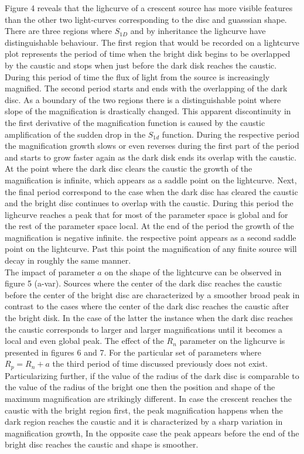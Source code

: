 Figure 4 reveals that the lighcurve of a crescent source has more visible features than the other two light-curves
corresponding to the disc and guasssian shape. There are three regions where $S_{1D}$ and by inheritance the lighcurve
 have distinguishable behaviour. The first region that would be recorded on a lightcurve plot represents the period
of time when the bright disk begins to be overlapped by the caustic and stops when just before the dark disk reaches
the caustic. During this period of time the flux of light from the source is increasingly magnified. The second
period starts and ends with the overlapping of the dark disc. As a boundary of the two regions there is a
distinguishable point where slope of the magnification is drastically changed. This apparent discontinuity in the
first derivative of the magnification function is caused by the caustic amplification of the sudden drop in the $S_{1d}$
function. During the respective period the magnification growth slows or even reverses during the first part of the
period and starts to grow faster again as the dark disk ends its overlap with the caustic. At the point where
the dark disc clears the caustic the growth of the magnification is infinite, which appears as a saddle point
on the lightcurve. Next, the final period correspond to the case when the dark disc has cleared the caustic
and the bright disc continues to overlap with the caustic. During this period the lighcurve reaches a peak
that for most of the parameter space is global and for the rest of the parameter space local.
At the end of the period the growth of the magnification is negative infinite. the respective point appears 
as a second saddle point on the lightcurve. Past this point the magnification of any finite source will 
decay in roughly the same manner. \\

The impact of parameter $a$ on the shape of the lightcurve can be observed in figure 5 (a-var). Sources where 
the center of the dark disc reaches the caustic before the center of the bright disc are characterized by a smoother
broad peak in contrast to the cases where the center of the dark disc reaches the caustic after the bright disk.
In the case of the latter the instance when the dark disc reaches the caustic corresponds to larger and
larger magnifications until it becomes a local and even global peak. The effect of the $R_n$  parameter on the
lighcurve is presented in figures 6 and 7. For the particular set of parameters where $R_p = R_n +a$ the third
period of time discussed previously does not exist. Particularizing further, if the value of the radius of the dark
disc is comparable to the value of the radius of the bright one then the position and shape of the maximum magnification
 are strikingly different. In case the crescent reaches the caustic with the bright region first, the peak magnification
 happens when the dark region reaches the caustic and it is characterized by a sharp variation in magnification growth,
In the opposite case the peak appears before the end of the bright disc reaches the caustic and shape is smoother. \\


